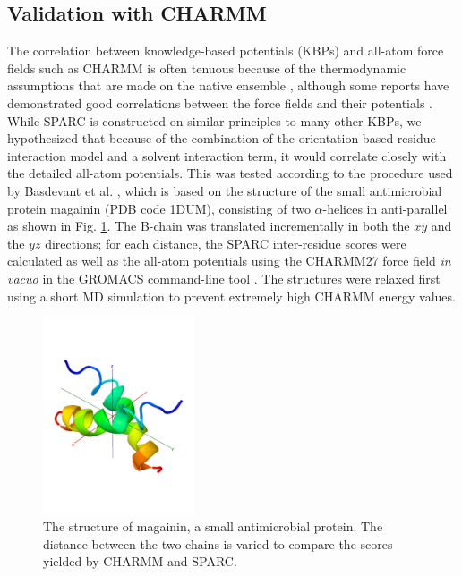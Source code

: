 \documentclass[11pt,titlepage]{article}
\begin{document}
\subsection{Validation with CHARMM}
The correlation between knowledge-based potentials (KBPs) and all-atom force fields such as CHARMM is often tenuous because of the thermodynamic assumptions that are made on the native ensemble \cite{mullinax}, although some reports have demonstrated good correlations between the force fields and their potentials \cite{mohanty,basdevant}.
While SPARC is constructed on similar principles to many other KBPs, we hypothesized that because of the combination of the orientation-based residue interaction model and a solvent interaction term, it would correlate closely with the detailed all-atom potentials.
This was tested according to the procedure used by Basdevant et al. \cite{basdevant}, which is based on the structure of the small antimicrobial protein magainin (PDB code 1DUM), consisting of two $\alpha$-helices in anti-parallel as shown in Fig. \ref{magainin}.
The B-chain was translated incrementally in both the $xy$ and the $yz$ directions; for each distance, the SPARC inter-residue scores were calculated as well as the all-atom potentials using the CHARMM27 force field \textit{in vacuo} in the GROMACS command-line tool \cite{gromacs}.
The structures were relaxed first using a short MD simulation to prevent extremely high CHARMM energy values.

\begin{figure}
	\includegraphics[trim={0 5cm 0 5cm}, clip=true, width=0.4\textwidth]{magainin_structure}
	\caption{The structure of magainin, a small antimicrobial protein. The distance between the two chains is varied to compare the scores yielded by CHARMM and SPARC.}
	\label{magainin}
\end{figure}
\end{document}
